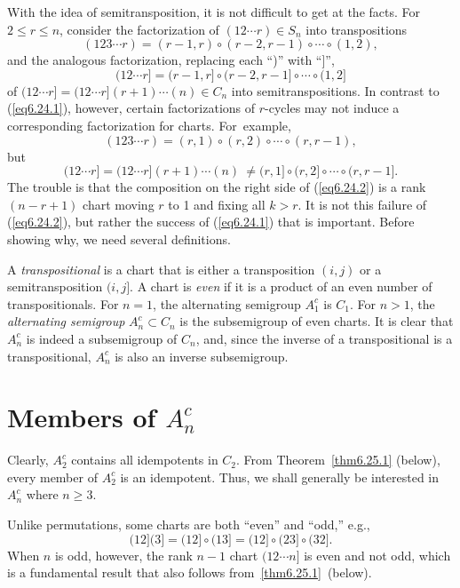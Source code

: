 \documentclass{surv-l}
\numberwithin{equation}{section}
\numberwithin{table}{section}
\numberwithin{figure}{section}
\theoremstyle{plain}
\theoremstyle{definition}
\begin{document}
With the idea of semitransposition, it is not difficult to get at
the facts. For $2\leq r\leq n$, consider the factorization of $(12\cdots
r)\in S_{n}$ into transpositions
\[
(123\cdots r)=(r-1, r)\circ(r-2, r-1)\circ\cdots\circ(1,2),
\]
and the analogous factorization, replacing each ``)'' with ``]'',
\begin{equation}\label{eq6.24.1}
(12\cdots r]=(r-1, r]\circ(r-2, r-1]\circ\cdots\circ(1,2]
\end{equation}
of $(12\cdots r]=(12\cdots r](r+1)\cdots(n) \in C_{n}$ into
semitranspositions. In contrast to (\ref{eq6.24.1}), however,
certain factorizations of $r$-cycles may not induce a
corresponding factorization for charts. For~example,
\[
(123\cdots r)=(r, 1)\circ(r, 2)\circ\cdots \circ(r, r-1),
\]
but
\begin{equation}\label{eq6.24.2}
(12\cdots r]=(12\cdots r](r+1)\cdots(n)\ \neq(r, 1]\circ(r, 2]\circ\cdots \circ (r, r-1].
\end{equation}
The trouble is that the composition on the right side of
(\ref{eq6.24.2}) is a rank $(n-r+1)$ chart moving $r$ to 1 and
fixing all $k>r$. It is not this failure of (\ref{eq6.24.2}), but
rather the success of (\ref{eq6.24.1}) that is important. Before
showing why, we need several definitions.

A \emph{transpositional} is a chart that is
either a transposition $(i,j)$ or a semitransposition $(i,j]$. A
chart is \emph{even} if it is a product of an
even number of transpositionals. For $n =1$, the alternating
semigroup $A_{1}^{c}$ is $C_{1}$. For $n >1$, the
\emph{alternating semigroup}
$A_{n}^{c}\subset C_{n}$ is the subsemigroup of even charts. It is
clear that $A_{n}^{c}$ is indeed a subsemigroup of $C_{n}$, and,
since the inverse of a transpositional is a transpositional,
$A_{n}^{c}$ is also an inverse subsemigroup.

\section{Members of $A_{n}^{c}$}\label{sec6.25}

Clearly, $A_{2}^{c}$ contains all idempotents in $C_{2}$. From
Theorem~\ref{thm6.25.1} (below), every member of $A_{2}^{c}$ is an
idempotent. Thus, we shall generally be interested in $A_{n}^{c}$
where $n \geq 3$.

Unlike permutations, some charts are both ``even'' and ``odd,'' e.g.,
\[
(12](3]=(12]\circ(13]=(12]\circ(23]\circ(32].
\]
When $n$ is odd, however, the rank $n-1$ chart $(12\cdots n]$ is
even and not odd, which is a fundamental result that also follows
from~\ref{thm6.25.1}~(below).
\end{document}
